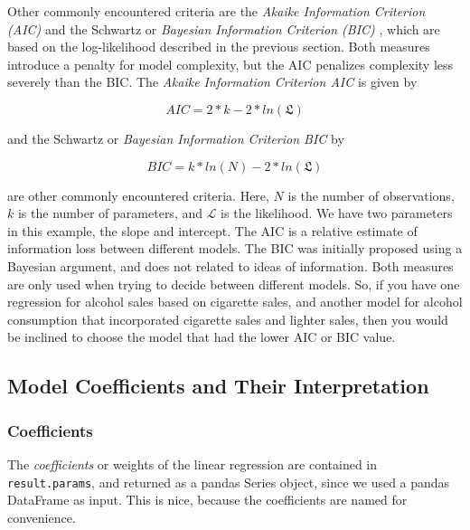 Other commonly encountered criteria are the \emph{Akaike Information Criterion (AIC)}  and the Schwartz or \emph{Bayesian Information Criterion (BIC)} , which are based on the log-likelihood described in the previous section. Both measures introduce a penalty for model complexity, but the AIC penalizes complexity less severely than the BIC.
The \emph{Akaike Information Criterion AIC}  is given by

\begin{equation}
  AIC = 2*k - 2*ln(\mathfrak{L})
\end{equation}

and the Schwartz or \emph{Bayesian Information Criterion BIC}  by

\begin{equation}
  BIC = k*ln(N) - 2*ln(\mathfrak{L})
\end{equation}

are other commonly encountered criteria. Here, $N$ is the number of observations, $k$ is the number of parameters, and $\mathcal{L}$ is the likelihood. We have two parameters in this example, the slope and intercept. The AIC is a relative estimate of information loss between different models. The BIC was initially proposed using a Bayesian argument, and does not related to ideas of information. Both measures are only used when trying to decide between different models. So, if you have one regression for alcohol sales based on cigarette sales, and another model for alcohol consumption that incorporated cigarette sales and lighter sales, then you would be inclined to choose the model that had the lower AIC or BIC value.

\subsection{Model Coefficients and Their Interpretation}

\subsubsection{Coefficients}
The \emph{coefficients} or weights of the linear regression are contained in \lstinline{result.params}, and returned as a pandas Series object, since we used a pandas DataFrame as input. This is nice, because the coefficients are named for convenience.

